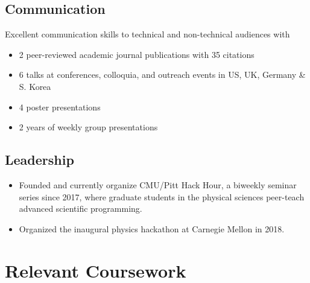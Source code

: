 \documentclass[11pt,letterpaper,sans]{moderncv}        %
\begin{document}
\subsection{Communication}
Excellent communication skills to technical and non-technical audiences with
\begin{itemize}

\item 2 peer-reviewed academic journal publications with 35 citations
\item 6 talks at conferences, colloquia, and outreach events in US, UK, Germany \& S. Korea
\item 4 poster presentations
\item 2 years of weekly group presentations
\end{itemize}

\subsection{Leadership}
\begin{itemize}
    \item Founded and currently organize CMU/Pitt Hack Hour, a biweekly seminar series since 2017, where graduate students in the physical sciences peer-teach advanced scientific programming.
    \item Organized the inaugural physics hackathon at Carnegie Mellon in 2018.
\end{itemize}

\section{Relevant Coursework}
\begin{cvcolumns}

\end{cvcolumns}
\end{document}

